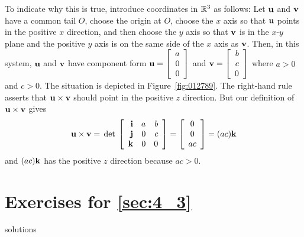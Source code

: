\noindent To indicate why this is true, introduce coordinates in $\mathbb{R}^3$ as follows: Let $\textbf{u}$ and $\textbf{v}$ have a common tail $O$, choose the origin at $O$, choose the $x$ axis so that $\textbf{u}$ points in the positive $x$ direction, and then choose the $y$ axis so that $\textbf{v}$ is in the $x$-$y$ plane and the positive $y$ axis is on the same side of the $x$ axis as $\textbf{v}$. Then, in this system, $\textbf{u}$ and $\textbf{v}$ have component form 
$\textbf{u} = \left[
\begin{array}{r}
a\\
0\\
0
\end{array}
\right]$
and 
$\textbf{v} = \left[
\begin{array}{r}
b\\
c\\
0
\end{array}
\right]$
 where $a > 0$ and $c > 0$. The situation is depicted in Figure~\ref{fig:012789}. The right-hand rule asserts that $\textbf{u} \times \textbf{v}$ should point in the positive $z$ direction. But our definition of $\textbf{u} \times \textbf{v}$ gives
\begin{equation*}
\textbf{u} \times \textbf{v} = \thinspace\operatorname{det\medspace}\left[
\begin{array}{rrr}
\textbf{i} & a & b\\
\textbf{j} & 0 & c\\
\textbf{k} & 0 & 0
\end{array}
\right] = 
\left[
\begin{array}{c}
0\\
0\\
ac
\end{array}
\right] = (ac)\textbf{k}
\end{equation*}
and $(ac) \textbf{k}$ has the positive $z$ direction because $ac > 0$.

\section*{Exercises for \ref{sec:4_3}}

\begin{Filesave}{solutions}
\end{Filesave}

